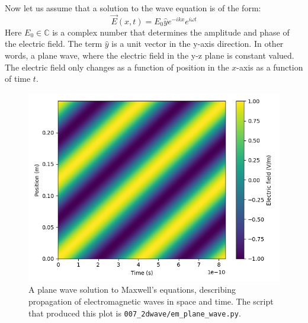 Now let us assume that a solution to the wave equation is of the form:
\begin{equation}
\vec{E}(x,t)= E_0 \hat{y} e^{-i k x}e^{i\omega t}
\label{efieldplanewave}
\end{equation}
Here $E_0 \in \mathbb{C}$ is a complex number that determines the amplitude and phase of the electric field. The term $\hat{y}$ is a unit vector in the y-axis direction. In other words, a plane wave, where the electric field in the y-z plane is constant valued. The electric field only changes as a function of position in the $x$-axis as a function of time $t$.

\begin{figure}
\begin{center}
\includegraphics[width=\textwidth]{code/007_2dwave/em_plane_wave.png}
\end{center}
\caption{A plane wave solution to Maxwell's equations, describing propagation of electromagnetic waves in space and time. The script that produced this plot is \texttt{007\_2dwave/em\_plane\_wave.py}. }
\label{fig:planewave}
\end{figure}

